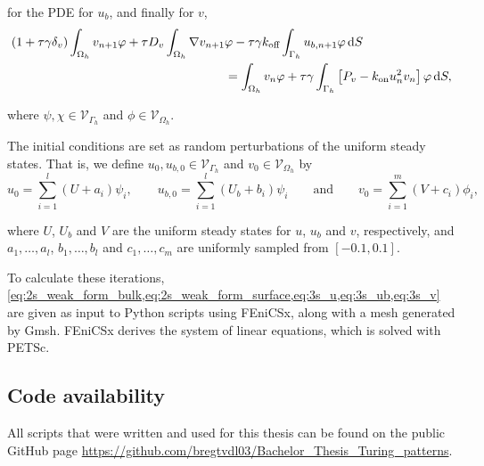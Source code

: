 \noindent
for the PDE for $u_b$, and finally for $v$,
%
\begin{equation}\label{eq:3s_v}
    \begin{aligned}
        (1 + \tau \gamma \delta_v) \int_{\Omega_h} v_{n + 1} \varphi + \tau D_v \int_{\Omega_h} \nabla v_{n + 1} &\varphi - \tau \gamma k_\text{off} \int_{\Gamma_h} u_{b, n + 1} \varphi \mathop{}\!\mathrm{d} S \\
        &= \int_{\Omega_h} v_n \varphi + \tau \gamma \int_{\Gamma_h} \left[ P_v - k_\text{on} u_n^2 v_n \right] \varphi \mathop{}\!\mathrm{d} S,
    \end{aligned}
\end{equation}

\noindent
where $\psi, \chi \in \mathcal{V}_{\Gamma_h}$ and $\phi \in \mathcal{V}_{\Omega_h}$.

The initial conditions are set as random perturbations of the uniform steady states. That is, we define $u_0, u_{b,0} \in \mathcal{V}_{\Gamma_h}$ and $v_0 \in \mathcal{V}_{\Omega_h}$ by
%
\begin{equation*}
    u_0 = \sum_{i = 1}^{l} (U + a_i) \psi_i, \qquad u_{b, 0} = \sum_{i = 1}^{l} (U_b + b_i) \psi_i \qquad \text{and} \qquad v_0 = \sum_{i = 1}^{m} (V + c_i) \phi_i,
\end{equation*}

\noindent
where $U$, $U_b$ and $V$ are the uniform steady states for $u$, $u_b$ and $v$, respectively, and $a_1, \dots, a_l$, $b_1, \dots, b_l$ and $c_1, \dots, c_m$ are uniformly sampled from $[-0.1, 0.1]$.

To calculate these iterations, \cref{eq:2s_weak_form_bulk,eq:2s_weak_form_surface,eq:3s_u,eq:3s_ub,eq:3s_v} are given as input to Python scripts using FEniCSx, along with a mesh generated by Gmsh. FEniCSx derives the system of linear equations, which is solved with PETSc.

\subsection{Code availability}

All scripts that were written and used for this thesis can be found on the public GitHub page \url{https://github.com/bregtvdl03/Bachelor_Thesis_Turing_patterns}.